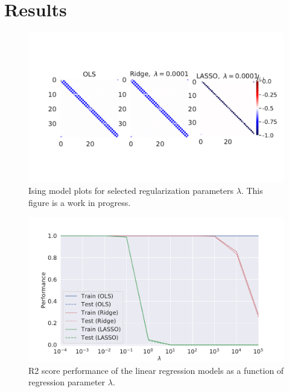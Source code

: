 \section{Results}
\begin{figure}[h]
\includegraphics[width = 0.8\paperwidth]{figures/regression_mehta_1.pdf} 
\caption{Ising model plots for selected regularization parameters $\lambda$.
	 This figure is a work in progress.} 
\label{fig:regression-mehta}
\end{figure}
\begin{figure}[h]
\includegraphics[width = 0.8\paperwidth]{figures/regression_r2.pdf}
    \caption{R2 score performance of the linear regression models as a function of
	     regression parameter $\lambda$.}
\label{fig:regression-r2}
\end{figure}
